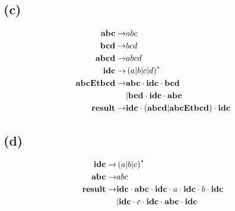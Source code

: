 \documentclass[class=article]{standalone}
\begin{document}
\subsection*{(c)}
\begin{align*}
    {\bf{abc}} \rightarrow&
        abc\\
    {\bf{bcd}} \rightarrow&
        bcd\\
    {\bf{abcd}} \rightarrow&
        abcd\\
    {\bf{idc}} \rightarrow&
        \left ( a|b|c|d \right )^*\\
    {\bf{abcEtbcd}} \rightarrow&
        {\bf{abc}} \cdot {\bf{idc}} \cdot {\bf{bcd}}\\&
        |{\bf{bcd}} \cdot {\bf{idc}} \cdot {\bf{abc}}\\
    {\bf{result}} \rightarrow&
    {\bf{idc}} \cdot \left ( {\bf{abcd}}|{\bf{abcEtbcd}} \right ) \cdot {\bf{idc}}
\end{align*}

\subsection*{(d)}
\begin{align*}
    {\bf{idc}} \rightarrow&
        \left ( a|b|c \right )^*\\
    {\bf{abc}} \rightarrow&
        abc\\
    {\bf{result}} \rightarrow&
        {\bf{idc}} \cdot {\bf{abc}} \cdot {\bf{idc}} \cdot a  \cdot {\bf{idc}} \cdot b \cdot {\bf{idc}}\\&
        |{\bf{idc}} \cdot c \cdot {\bf{idc}} \cdot {\bf{abc}} \cdot {\bf{idc}}
\end{align*}
\end{document}
